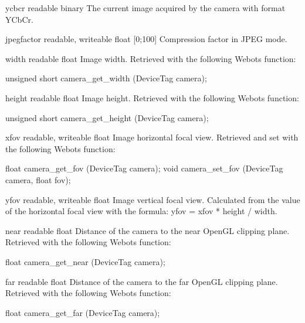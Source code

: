 \begin{itemize}
\begin{attribute}{ycbcr}
  {readable}
  {binary}
  {}
  The current image acquired by the camera with format YCbCr.
\end{attribute}

\begin{attribute}{jpegfactor}
  {readable, writeable}
  {float}
  {[0;100]}
  Compression factor in JPEG mode.
\end{attribute}

\begin{attribute}{width}
  {readable}
  {float}
  {}
  Image width. Retrieved with the following Webots function:
\begin{cxx}
unsigned short camera_get_width (DeviceTag camera);
\end{cxx}
\end{attribute}

\begin{attribute}{height}
  {readable}
  {float}
  {}
  Image height. Retrieved with the following Webots function:
\begin{cxx}
unsigned short camera_get_height (DeviceTag camera);
\end{cxx}
\end{attribute}

\begin{attribute}{xfov}
  {readable, writeable}
  {float}
  {}
  Image horizontal focal view.  Retrieved and set with
  the following Webots function:
\begin{cxx}
float camera_get_fov (DeviceTag camera);
void camera_set_fov (DeviceTag camera, float fov);
\end{cxx}
\end{attribute}

\begin{attribute}{yfov}
  {readable, writeable}
  {float}
  {}
  Image vertical focal view. Calculated from the value of
  the horizontal focal view with the formula: yfov = xfov * height /
  width.
\end{attribute}

\begin{attribute}{near}
  {readable}
  {float}
  {}
  Distance of the camera to the near OpenGL clipping
  plane.  Retrieved with the following Webots function:
\begin{cxx}
float camera_get_near (DeviceTag camera);
\end{cxx}
\end{attribute}

\begin{attribute}{far}
  {readable}
  {float}
  {}
  Distance of the camera to the far OpenGL clipping
  plane.  Retrieved with the following Webots function:
\begin{cxx}
float camera_get_far (DeviceTag camera);
\end{cxx}
\end{attribute}
\end{itemize}

